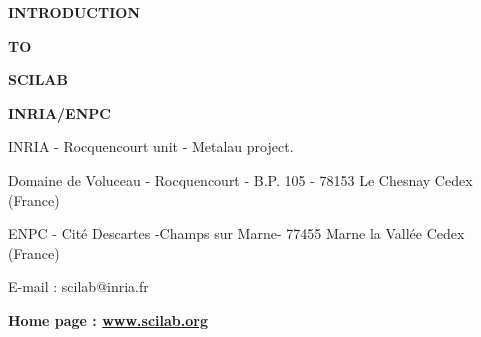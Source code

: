 

\pagestyle{empty}



\vspace{8.cm}

{\Huge\bf  {INTRODUCTION}}

\bigskip

{\Huge\bf  {TO}}

\bigskip

{\Huge\bf  {SCILAB}}



\vspace{3.cm}


{\Large\bf
INRIA/ENPC}

{\normalsize\bf

\vspace{12.cm}

INRIA - Rocquencourt unit - Metalau project.

Domaine de Voluceau - Rocquencourt - B.P. 105 - 78153 Le Chesnay Cedex (France)

ENPC - Cit\'e Descartes -Champs sur Marne- 77455 Marne la Vall\'ee Cedex (France)

E-mail : scilab@inria.fr}

{\normalsize\bf Home page : \href{http://www.scilab.org}{www.scilab.org}}

\newpage
\mbox{ }
\newpage



